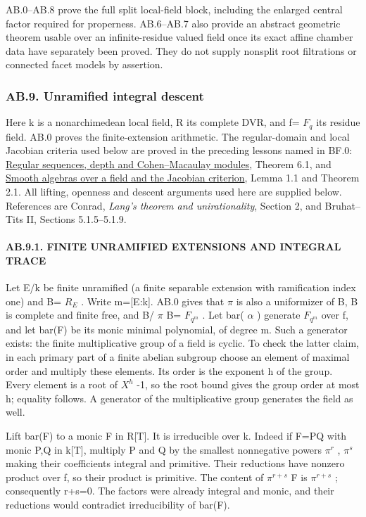 \documentclass[
  11pt,
]{article}
\begin{document}
AB.0--AB.8 prove the full split local-field block, including the
enlarged central factor required for properness. AB.6--AB.7 also provide
an abstract geometric theorem usable over an infinite-residue valued
field once its exact affine chamber data have separately been proved.
They do not supply nonsplit root filtrations or connected facet models
by assertion.

\subsubsection{AB.9. Unramified integral
descent}\label{ab.9.-unramified-integral-descent}

Here k is a nonarchimedean local field, R its complete DVR, and f=
\(F_{q}\) its residue field. AB.0 proves the finite-extension
arithmetic. The regular-domain and local Jacobian criteria used below
are proved in the preceding lessons named in BF.0:
\href{../AG-CA/AG-CA-12.html}{Regular sequences, depth and
Cohen--Macaulay modules}, Theorem 6.1, and
\href{../AG-CA/AG-CA-18.html}{Smooth algebras over a field and the
Jacobian criterion}, Lemma 1.1 and Theorem 2.1. All lifting, openness
and descent arguments used here are supplied below. References are
Conrad, \emph{Lang's theorem and unirationality}, Section 2, and
Bruhat--Tits II, Sections 5.1.5--5.1.9.

\paragraph{AB.9.1. FINITE UNRAMIFIED EXTENSIONS AND INTEGRAL
TRACE}\label{ab.9.1.-finite-unramified-extensions-and-integral-trace}

Let E/k be finite unramified (a finite separable extension with
ramification index one) and B= \(R_{E}\) . Write m={[}E:k{]}. AB.0 gives
that \(\pi\) is also a uniformizer of B, B is complete and finite free,
and B/ \(\pi\) B= \(F_{q^m}\) . Let bar( \(\alpha\) ) generate
\(F_{q^m}\) over f, and let bar(F) be its monic minimal polynomial, of
degree m. Such a generator exists: the finite multiplicative group of a
field is cyclic. To check the latter claim, in each primary part of a
finite abelian subgroup choose an element of maximal order and multiply
these elements. Its order is the exponent h of the group. Every element
is a root of \(X^h\) -1, so the root bound gives the group order at most
h; equality follows. A generator of the multiplicative group generates
the field as well.

Lift bar(F) to a monic F in R{[}T{]}. It is irreducible over k. Indeed
if F=PQ with monic P,Q in k{[}T{]}, multiply P and Q by the smallest
nonnegative powers \(\pi^r\) , \(\pi^s\) making their coefficients
integral and primitive. Their reductions have nonzero product over f, so
their product is primitive. The content of \(\pi^{r+s}\) F is
\(\pi^{r+s}\) ; consequently r+s=0. The factors were already integral
and monic, and their reductions would contradict irreducibility of
bar(F).
\end{document}
